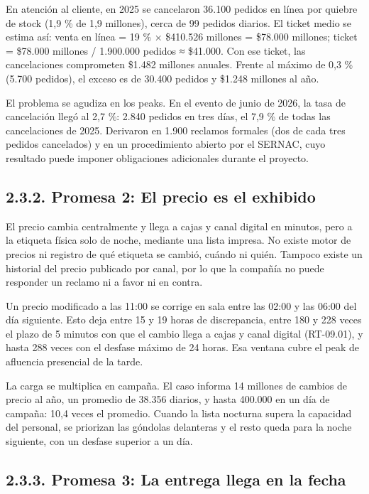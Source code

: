\documentclass[11pt]{article}
\begin{document}
En atención al cliente, en 2025 se cancelaron 36.100 pedidos en línea por quiebre de stock (1,9 \% de 1,9 millones), cerca de 99 pedidos diarios. El ticket medio se estima así: venta en línea = 19 \% × \$410.526 millones = \$78.000 millones; ticket = \$78.000 millones / 1.900.000 pedidos ≈ \$41.000. Con ese ticket, las cancelaciones comprometen \$1.482 millones anuales. Frente al máximo de 0,3 \% (5.700 pedidos), el exceso es de 30.400 pedidos y \$1.248 millones al año.

El problema se agudiza en los peaks. En el evento de junio de 2026, la tasa de cancelación llegó al 2,7 \%: 2.840 pedidos en tres días, el 7,9 \% de todas las cancelaciones de 2025. Derivaron en 1.900 reclamos formales (dos de cada tres pedidos cancelados) y en un procedimiento abierto por el SERNAC, cuyo resultado puede imponer obligaciones adicionales durante el proyecto.

\subsection{2.3.2. Promesa 2: El precio es el exhibido}\label{promesa-2-el-precio-es-el-exhibido}

El precio cambia centralmente y llega a cajas y canal digital en minutos, pero a la etiqueta física solo de noche, mediante una lista impresa. No existe motor de precios ni registro de qué etiqueta se cambió, cuándo ni quién. Tampoco existe un historial del precio publicado por canal, por lo que la compañía no puede responder un reclamo ni a favor ni en contra.

Un precio modificado a las 11:00 se corrige en sala entre las 02:00 y las 06:00 del día siguiente. Esto deja entre 15 y 19 horas de discrepancia, entre 180 y 228 veces el plazo de 5 minutos con que el cambio llega a cajas y canal digital (RT-09.01), y hasta 288 veces con el desfase máximo de 24 horas. Esa ventana cubre el peak de afluencia presencial de la tarde.

La carga se multiplica en campaña. El caso informa 14 millones de cambios de precio al año, un promedio de 38.356 diarios, y hasta 400.000 en un día de campaña: 10,4 veces el promedio. Cuando la lista nocturna supera la capacidad del personal, se priorizan las góndolas delanteras y el resto queda para la noche siguiente, con un desfase superior a un día.

\subsection{2.3.3. Promesa 3: La entrega llega en la fecha}\label{promesa-3-la-entrega-llega-en-la-fecha}
\end{document}
